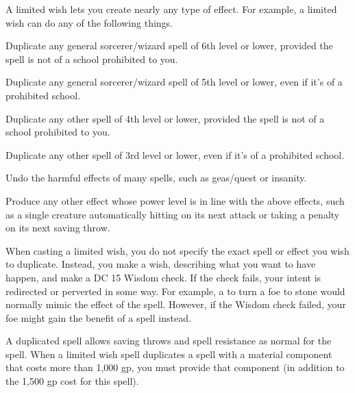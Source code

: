 \begin{spelleffect}
  A limited wish lets you create nearly any type of effect. For example, a limited wish can do any of the following things.
  \begin{itemize*}
    \item Duplicate any general sorcerer/wizard spell of 6th level or lower, provided the spell is not of a school prohibited to you.
    \item Duplicate any general sorcerer/wizard spell of 5th level or lower, even if it's of a prohibited school.
    \item Duplicate any other spell of 4th level or lower, provided the spell is not of a school prohibited to you.
    \item Duplicate any other spell of 3rd level or lower, even if it's of a prohibited school.
    \item Undo the harmful effects of many spells, such as geas/quest or insanity.
    \item Produce any other effect whose power level is in line with the above effects, such as a single creature automatically hitting on its next attack or taking a  penalty on its next saving throw.
  \end{itemize*}
  \par When casting a limited wish, you do not specify the exact spell or effect you wish to duplicate. Instead, you make a wish, describing what you want to have happen, and make a DC 15 Wisdom check. If the check fails, your intent is redirected or perverted in some way. For example, a  to turn a foe to stone would normally mimic the  effect of the  spell. However, if the Wisdom check failed, your foe might gain the benefit of a  spell instead.
  \par A duplicated spell allows saving throws and spell resistance as normal for the spell. When a limited wish spell duplicates a spell with a material component that costs more than 1,000 gp, you must provide that component (in addition to the 1,500 gp cost for this spell).
\end{spelleffect}

